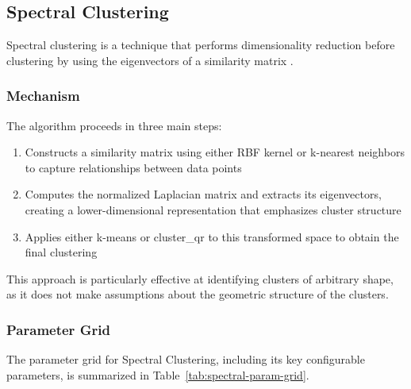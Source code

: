 \subsection{Spectral Clustering}
\label{subsec:methods-spectral-clustering}

Spectral clustering is a technique that performs dimensionality reduction before clustering by using the eigenvectors of a similarity matrix \cite{2018-spectral}.

\subsubsection{Mechanism}

The algorithm proceeds in three main steps:
\begin{enumerate}
    \item Constructs a similarity matrix using either RBF kernel or k-nearest neighbors to capture relationships between data points
    \item Computes the normalized Laplacian matrix and extracts its eigenvectors, creating a lower-dimensional representation that emphasizes cluster structure
    \item Applies either k-means or cluster\_qr to this transformed space to obtain the final clustering
\end{enumerate}

This approach is particularly effective at identifying clusters of arbitrary shape, as it does not make assumptions about the geometric structure of the clusters.

\subsubsection{Parameter Grid}

The parameter grid for Spectral Clustering, including its key configurable parameters, is summarized in Table~\ref{tab:spectral-param-grid}.

